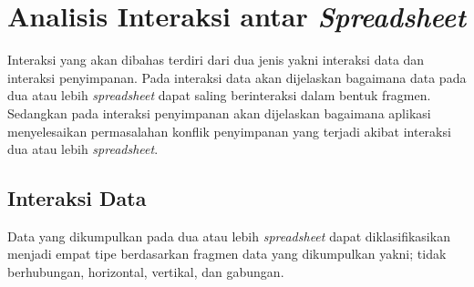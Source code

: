 \section{Analisis Interaksi antar \textit{Spreadsheet}}
Interaksi yang akan dibahas terdiri dari dua jenis yakni interaksi data dan interaksi penyimpanan. Pada interaksi data akan dijelaskan bagaimana data pada dua atau lebih \textit{spreadsheet} dapat saling berinteraksi dalam bentuk fragmen. Sedangkan pada interaksi penyimpanan akan dijelaskan bagaimana aplikasi menyelesaikan permasalahan konflik penyimpanan yang terjadi akibat interaksi dua atau lebih \textit{spreadsheet}.

\subsection{Interaksi Data}
Data yang dikumpulkan pada dua atau lebih \textit{spreadsheet} dapat diklasifikasikan menjadi empat tipe berdasarkan fragmen data yang dikumpulkan yakni; tidak berhubungan, horizontal, vertikal, dan gabungan.

